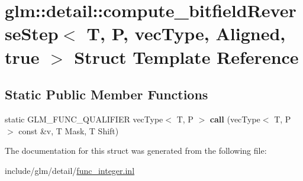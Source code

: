 \hypertarget{structglm_1_1detail_1_1compute__bitfieldReverseStep_3_01T_00_01P_00_01vecType_00_01Aligned_00_01true_01_4}{}\section{glm\+:\+:detail\+:\+:compute\+\_\+bitfield\+Reverse\+Step$<$ T, P, vec\+Type, Aligned, true $>$ Struct Template Reference}
\label{structglm_1_1detail_1_1compute__bitfieldReverseStep_3_01T_00_01P_00_01vecType_00_01Aligned_00_01true_01_4}
\subsection*{Static Public Member Functions}
\begin{DoxyCompactItemize}
\item 
\mbox{\label{structglm_1_1detail_1_1compute__bitfieldReverseStep_3_01T_00_01P_00_01vecType_00_01Aligned_00_01true_01_4_a823f1a6a1f91ef154a334afb668f54e6}} 
static G\+L\+M\+\_\+\+F\+U\+N\+C\+\_\+\+Q\+U\+A\+L\+I\+F\+I\+ER vec\+Type$<$ T, P $>$ {\bfseries call} (vec\+Type$<$ T, P $>$ const \&v, T Mask, T Shift)
\end{DoxyCompactItemize}


The documentation for this struct was generated from the following file\+:\begin{DoxyCompactItemize}
\item 
include/glm/detail/\hyperlink{func__integer_8inl}{func\+\_\+integer.\+inl}\end{DoxyCompactItemize}
